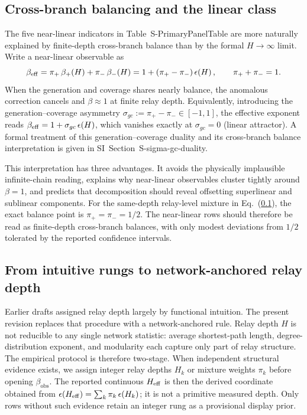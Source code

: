 \subsection{Cross-branch balancing and the linear class}
\label{subsec:cross_branch_balance}
The five near-linear indicators in Table~\textsf{S-PrimaryPanelTable} are more
naturally explained by finite-depth cross-branch balance than by the formal
$H\to\infty$ limit. Write a near-linear observable as
\begin{equation}
\beta_{\mathrm{eff}}=\pi_{+}\,\beta_+\!\left(H\right)+\pi_{-}\,\beta_-\!\left(H\right)
    =1+(\pi_{+}-\pi_{-})\,\epsilon\!\left(H\right),
\qquad \pi_{+}+\pi_{-}=1.
\label{eq:same_depth_balance}
\end{equation}
When the generation and coverage shares nearly balance, the anomalous
correction cancels and $\beta\approx 1$ at finite relay depth.
Equivalently, introducing the generation--coverage asymmetry
$\sigma_{gc}:=\pi_{+}-\pi_{-}\in[-1,1]$, the effective exponent reads
$\beta_{\mathrm{eff}}=1+\sigma_{gc}\,\epsilon\!\left(H\right)$, which vanishes exactly at $\sigma_{gc}=0$
(linear attractor).  A formal treatment of this generation--coverage duality
and its cross-branch balance interpretation is given in
SI~Section~\textsf{S-sigma-gc-duality}.

This interpretation has three advantages. It avoids the physically implausible
infinite-chain reading, explains why near-linear observables cluster tightly
around $\beta=1$, and predicts that decomposition should reveal offsetting
superlinear and sublinear components. For the same-depth relay-level mixture
in Eq.~(\ref{subsec:cross_branch_balance}), the exact balance point is
$\pi_{+}=\pi_{-}=1/2$. The near-linear rows should therefore be read as
finite-depth cross-branch balances, with only modest deviations from
$1/2$ tolerated by the reported confidence intervals.

\subsection{From intuitive rungs to network-anchored relay depth}\label{subsec:network_anchored_relay}
Earlier drafts assigned relay depth largely by functional intuition. The
present revision replaces that procedure with a network-anchored rule. Relay
depth $H$ is not reducible to any single network statistic: average
shortest-path length, degree-distribution exponent, and modularity each capture
only part of relay structure. The empirical protocol is therefore two-stage.
When independent structural evidence exists, we assign integer relay depths
$H_k$ or mixture weights $\pi_k$ before opening $\beta_{\mathrm{obs}}$.
The reported continuous $H_{\mathrm{eff}}$ is then the derived coordinate obtained from
$\epsilon\!\left(H_{\mathrm{eff}}\right)=\sum_k \pi_k\,\epsilon\!\left(H_k\right)$; it is not a primitive measured depth.
Only rows without such evidence retain an integer rung as a provisional display prior.

